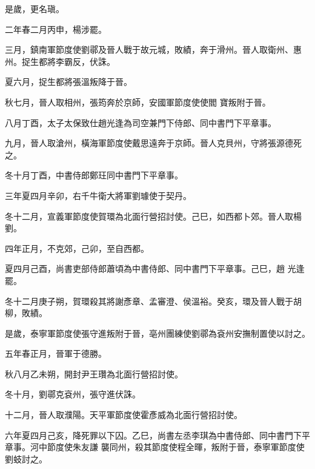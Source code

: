\begin{pinyinscope}
 是歲，更名瑱。



 二年春二月丙申，楊涉罷。



 三月，鎮南軍節度使劉鄩及晉人戰于故元城，敗績，奔于滑州。晉人取衛州、惠州。捉生都將李霸反，伏誅。



 夏六月，捉生都將張溫叛降于晉。



 秋七月，晉人取相州，張筠奔於京師，安國軍節度使使閻
 寶叛附于晉。



 八月丁酉，太子太保致仕趙光逢為司空兼門下侍郎、同中書門下平章事。



 九月，晉人取滄州，橫海軍節度使戴思遠奔于京師。晉人克貝州，守將張源德死之。



 冬十月丁酉，中書侍郎鄭玨同中書門下平章事。



 三年夏四月辛卯，右千牛衛大將軍劉璩使于契丹。



 冬十二月，宣義軍節度使賀環為北面行營招討使。己巳，如西都卜郊。晉人取楊劉。



 四年正月，不克郊，己卯，至自西都。



 夏四月己酉，尚書吏部侍郎蕭頃為中書侍郎、同中書門下平章事。己巳，趙
 光逢罷。



 冬十二月庚子朔，賀環殺其將謝彥章、孟審澄、侯溫裕。癸亥，環及晉人戰于胡柳，敗績。



 是歲，泰寧軍節度使張守進叛附于晉，亳州團練使劉鄩為袞州安撫制置使以討之。



 五年春正月，晉軍于德勝。



 秋八月乙未朔，開封尹王瓚為北面行營招討使。



 冬十月，劉鄩克袞州，張守進伏誅。



 十二月，晉人取濮陽。天平軍節度使霍彥威為北面行營招討使。



 六年夏四月己亥，降死罪以下囚。乙巳，尚書左丞李琪為中書侍郎、同中書門下平章事。河中節度使朱友謙
 襲同州，殺其節度使程全暉，叛附于晉，泰寧軍節度使劉蚑討之。




\end{pinyinscope}
